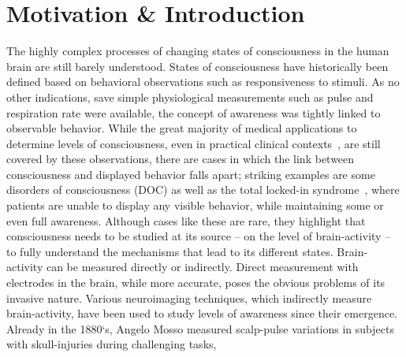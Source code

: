 \chapter{Motivation \& Introduction}\label{ch:introduction}




The highly complex processes of changing states of consciousness in the human brain are still barely understood.
States of consciousness have historically been defined based on behavioral observations such as responsiveness to
stimuli.
As no other indications, save simple physiological measurements such as pulse and respiration rate
were available, the concept of awareness was tightly linked to observable behavior.
While the great majority of medical applications to determine levels of consciousness,
even in practical clinical contexts~\cite{jain_glasgow_2022},
are still covered by these observations,
there are cases in which the link between consciousness and displayed behavior falls apart;
striking examples are some disorders of consciousness (DOC) as well as the total locked-in
syndrome~\cite{bauer_varieties_1979},
where patients are unable to display any visible behavior,
while maintaining some or even full awareness.
Although cases like these are rare, they highlight that consciousness needs to be studied at its source -- on the
level of brain-activity -- to fully understand the mechanisms that lead to its different states.
%
%
Brain-activity can be measured directly or indirectly.
Direct measurement with electrodes in the brain, while more accurate,
poses the obvious problems of its invasive nature.
Various neuroimaging techniques, which indirectly measure brain-activity, have been used to study levels of
awareness since their emergence.
Already in the 1880`s, Angelo Mosso measured scalp-pulse variations in subjects
with skull-injuries during challenging tasks,
